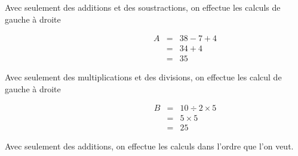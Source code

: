 \documentclass[a4paper,10pt]{report}
\begin{document}
\noindent \begin{minipage}{10cm} 
\begin{memento}
Avec seulement des additions et des soustractions, on effectue les calculs de gauche à droite
\end{memento}
\end{minipage}
\hspace{5mm}
\begin{minipage}{6cm}
\begin{ex}  

\vspace{-1cm}
\begin{eqnarray*}
\hspace{3cm}A &=& 38 -7 +4 \\
&=& 34 + 4 \\
&=& 35
\end{eqnarray*}
\end{ex}
\end{minipage}

\noindent \begin{minipage}{10cm} 
\begin{memento}
Avec seulement des multiplications et des divisions, on effectue les calcul de gauche à droite
\end{memento}
\end{minipage}
\hspace{5mm}
\begin{minipage}{6cm}
\begin{ex}

\vspace{-1cm}
\begin{eqnarray*}
\hspace{3cm}B &=& 10 \div 2 \times 5 \\
&=& 5 \times 5 \\
&=& 25
\end{eqnarray*}
\end{ex}
\end{minipage}

\begin{memento}
Avec seulement des additions, on effectue les calculs dans l'ordre que l'on veut.
\end{memento}
\end{document}
